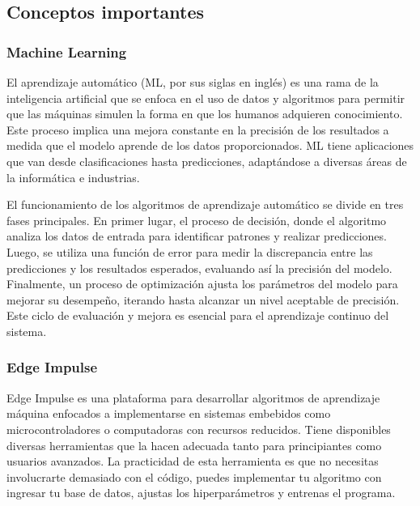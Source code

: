 \documentclass[12pt,a4paper]{article}
\begin{document}
\subsection{Conceptos importantes}

\subsubsection{Machine Learning}
El aprendizaje automático (ML, por sus siglas en inglés) es una rama de la inteligencia artificial que se enfoca en el uso de datos y algoritmos para permitir que las máquinas simulen la forma en que los humanos adquieren conocimiento. Este proceso implica una mejora constante en la precisión de los resultados a medida que el modelo aprende de los datos proporcionados. ML tiene aplicaciones que van desde clasificaciones hasta predicciones, adaptándose a diversas áreas de la informática e industrias. \cite{ml}

El funcionamiento de los algoritmos de aprendizaje automático se divide en tres fases principales. En primer lugar, el proceso de decisión, donde el algoritmo analiza los datos de entrada para identificar patrones y realizar predicciones. Luego, se utiliza una función de error para medir la discrepancia entre las predicciones y los resultados esperados, evaluando así la precisión del modelo. Finalmente, un proceso de optimización ajusta los parámetros del modelo para mejorar su desempeño, iterando hasta alcanzar un nivel aceptable de precisión. Este ciclo de evaluación y mejora es esencial para el aprendizaje continuo del sistema. \cite{ml}

\subsubsection{Edge Impulse}
Edge Impulse es una plataforma para desarrollar algoritmos de aprendizaje máquina enfocados a implementarse en sistemas embebidos como microcontroladores o computadoras con recursos reducidos. Tiene disponibles diversas herramientas que la hacen adecuada tanto para principiantes como usuarios avanzados. La practicidad de esta herramienta es que no necesitas involucrarte demasiado con el código, puedes implementar tu algoritmo con ingresar tu base de datos, ajustas los hiperparámetros y entrenas el programa. \cite{ei}
\end{document}
